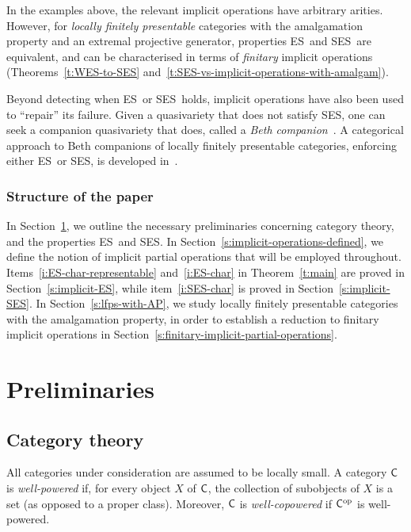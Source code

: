 \documentclass[a4paper,10pt,reqno]{amsart}
\theoremstyle{definition}
\theoremstyle{remark}
\newcommand{\cat}{{\sf C}}								%
\newcommand{\op}{{\mathrm{op}}}						%
\newcommand{\ES}{\textnormal{ES}}
\newcommand{\SES}{\textnormal{SES}}
\begin{document}
In the examples above, the relevant implicit operations have arbitrary arities. However, for \emph{locally finitely presentable} categories with the amalgamation property and an extremal projective generator, properties \ES~and \SES~are equivalent, and can be characterised in terms of \emph{finitary} implicit operations (Theorems~\ref{t:WES-to-SES} and~\ref{t:SES-vs-implicit-operations-with-amalgam}).

\medskip
Beyond detecting when \ES~or \SES~holds, implicit operations have also been used to ``repair'' its failure. Given a quasivariety that does not satisfy \SES, one can seek a companion quasivariety that does, called a \emph{Beth companion}~\cite{CKM2026}. A categorical approach to Beth companions of locally finitely presentable categories, enforcing either \ES~or \SES, is developed in~\cite{DLR2026}.

\subsubsection*{Structure of the paper} In Section~\ref{s:preliminaries}, we outline the necessary preliminaries concerning category theory, and the properties \ES~and \SES. In Section~\ref{s:implicit-operations-defined}, we define the notion of implicit partial operations that will be employed throughout. Items~\ref{i:ES-char-representable} and~\ref{i:ES-char} in Theorem~\ref{t:main} are proved in Section~\ref{s:implicit-ES}, while item~\ref{i:SES-char} is proved in Section~\ref{s:implicit-SES}. In Section~\ref{s:lfps-with-AP}, we study locally finitely presentable categories with the amalgamation property, in order to establish a reduction to finitary implicit operations in Section~\ref{s:finitary-implicit-partial-operations}.


\section{Preliminaries}\label{s:preliminaries}

\subsection{Category theory}\label{s:category-theory}
All categories under consideration are assumed to be locally small.
%
A category $\cat$ is \emph{well-powered} if, for every object $X$ of $\cat$, the collection of subobjects of $X$ is a set (as opposed to a proper class). Moreover, $\cat$ is \emph{well-copowered} if $\cat^{\op}$ is well-powered.
\end{document}
